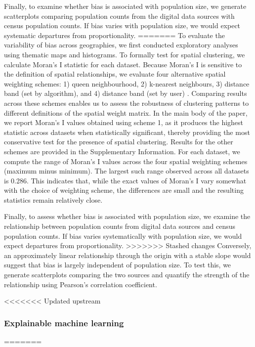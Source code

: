 \documentclass[]{rsos}%
\begin{document}
Finally, to examine whether bias is associated with population size, we
generate scatterplots comparing population counts from the digital data
sources with census population counts. If bias varies with population
size, we would expect systematic departures from proportionality.
=======
To evaluate the variability of bias across geographies, we first
conducted exploratory analyses using thematic maps and histograms. To
formally test for spatial clustering, we calculate Moran's I statistic
for each dataset. Because Moran's I is sensitive to the definition of
spatial relationships, we evaluate four alternative spatial weighting
schemes: 1) queen neighbourhood, 2) k-nearest neighbours, 3) distance
band (set by algorithm), and 4) distance band (set by user) \citep{rey2023}.
Comparing results across these schemes enables us to assess the
robustness of clustering patterns to different definitions of the
spatial weight matrix. In the main body of the paper, we report Moran's
I values obtained using scheme 1, as it produces the highest statistic
across datasets when statistically significant, thereby providing the
most conservative test for the presence of spatial clustering. Results
for the other schemes are provided in the Supplementary Information. For
each dataset, we compute the range of Moran's I values across the four
spatial weighting schemes (maximum minus minimum). The largest such
range observed across all datasets is 0.286. This indicates that, while
the exact values of Moran's I vary somewhat with the choice of weighting
scheme, the differences are small and the resulting statistics remain
relatively close.

Finally, to assess whether bias is associated with population size, we
examine the relationship between population counts from digital data
sources and census population counts. If bias varies systematically with
population size, we would expect departures from proportionality.
>>>>>>> Stashed changes
Conversely, an approximately linear relationship through the origin with
a stable slope would suggest that bias is largely independent of
population size. To test this, we generate scatterplots comparing the
two sources and quantify the strength of the relationship using
Pearson's correlation coefficient.

<<<<<<< Updated upstream
\subsubsection{Explainable machine learning}\label{explainable-machine-learning}
=======
\end{document}
